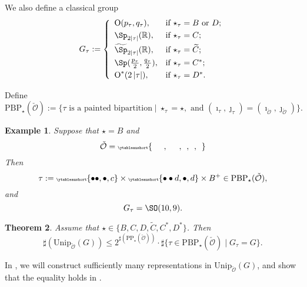 \documentclass[12pt,a4paper]{amsart}
\let\ytb=\ytableaushort
\newcommand{\tytb}[1]{{\tiny\ytb{#1}}}
\def\abs#1{\left|{#1}\right|}
\newcommand{\CO}{{\mathcal {O}}}
\newcommand{\oO}{\operatorname{O}}
\newcommand{\R}{\mathbb R}
\numberwithin{equation}{section}
\newtheorem{thm}{Theorem}[section]
\newtheorem{eg}[thm]{Example}
\theoremstyle{remark}
\def\Unip{\mathrm{Unip}}
\begin{document}
We also define a classical group
  \begin{equation}\label{def:Gt}
 G_\tau:= \left\{
     \begin{array}{ll}
         \oO(p_\tau, q_\tau), &\hbox{if $\star_\tau=B$ or $D$}; \smallskip\\
            \Sp_{2\abs{\tau}}(\R), &\hbox{if $\star_\tau=C$}; \smallskip\\
           \widetilde{\Sp}_{2\abs{\tau}}(\R), &\hbox{if $\star_\tau=\widetilde{ C}$}; \smallskip \\
        \Sp(\frac{p_\tau}{2}, \frac{q_\tau}{2}), &\hbox{if $\star_\tau=C^*$}; \smallskip \\
          \oO^*(2\abs{\tau}), &\hbox{if $\star_\tau=D^*$}.\\
            \end{array}
   \right.
\end{equation}

Define
\[
\mathrm{PBP}_\star(\check \CO):=\{ 
\tau\textrm{ is a painted bipartition}  \mid    \star_\tau = \star, 
 \text{ and }    (\imath_\tau,\jmath_\tau) = (\imath_{\check \CO}, \jmath_{\check \CO})\}.
\]


\delete{
\[
\begin{array}{rl}
\mathrm{PBP}_\star(\check \CO):=\{ &
\tau\textrm{ is a painted bipartition}  \mid    \star_\tau = \star, 
 \text{ and } \\  & (\imath_\tau,\jmath_\tau) = (\imath_{\check \CO}, \jmath_{\check \CO})\}.
\end{array}
\]
}




\begin{eg} Suppose that $\star=B$ and
\[
 \check \CO =\tytb{\ \ \ \ \ \ , \ \ \ \ \ \ , \ \ , \ \ , \ \  }
\]
Then
\[
\tau:= \tytb{\bullet \bullet ,\bullet , c } \times \tytb{\bullet \bullet  d ,\bullet , d }\times B^+\in \mathrm{PBP}_{\star}(\check \CO),
\]
and
\[
G_\tau=\SO(10,9).
 \]
\end{eg}





\begin{thm}\label{countup}
Assume that $\star\in  \{B, C,D,\widetilde {C}, C^*, D^*\}$. Then
 \[
\sharp(\Unip_{\check \CO}(G))\leq 2^{\sharp(\mathrm{PP}_\star(\check \CO))} \cdot  \sharp \{\tau\in \mathrm{PBP}_\star(\check \CO)\mid  G_\tau=G\}.     
   \]
\end{thm}

In \cite{BMSZ2}, we will construct sufficiently many representations in $\Unip_{\check \CO}(G)$, and show that the equality holds in .
\end{document}
